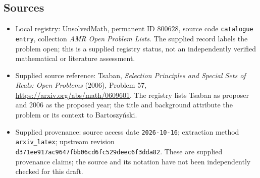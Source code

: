 \documentclass[11pt]{article}
\begin{document}
\subsection{Sources}
\begin{itemize}
\item Local registry: UnsolvedMath, permanent ID \(800628\), source code \texttt{catalogue entry}, collection \emph{AMR Open Problem Lists}. The supplied record labels the problem open; this is a supplied registry status, not an independently verified mathematical or literature assessment.
\item Supplied source reference: Tsaban, \emph{Selection Principles and Special Sets of Reals: Open Problems} (2006), Problem 57, \url{https://arxiv.org/abs/math/0609601}. The registry lists Tsaban as proposer and 2006 as the proposed year; the title and background attribute the problem or its context to Bartoszy\'nski.
\item Supplied provenance: source access date \texttt{2026-10-16}; extraction method \texttt{arxiv\_latex}; upstream revision \texttt{d371ee917ac9647fbb06cd6fc529deec6f3dda82}. These are supplied provenance claims; the source and its notation have not been independently checked for this draft.
\end{itemize}
\end{document}
